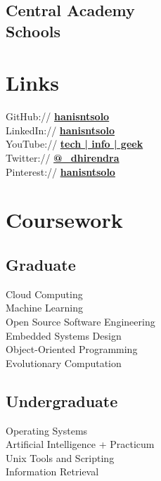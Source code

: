 \documentclass[]{dhirendra-pratap-singh-resume}
\begin{document}
\begin{minipage}[t]{0.33\textwidth}
\subsection{Central Academy \\ Schools}
\sectionsep


\section{Links} 
GitHub:// \href{https://github.com/hanisntsolo}{\bf hanisntsolo} \\
LinkedIn://  \href{https://www.linkedin.com/in/hanisntsolo/}{\bf hanisntsolo} \\
YouTube://  \href{https://www.youtube.com/channel/UCudY5NQeinXTD9I6eVn1WeQ}{\bf tech | info | geek} \\
Twitter://  \href{https://twitter.com/_dhirendra}{\bf @\_dhirendra} \\
Pinterest://  \href{https://in.pinterest.com/hanisntoslo/boards/}{\bf hanisntsolo}
\sectionsep


\section{Coursework}
\subsection{Graduate}
Cloud Computing \\
Machine Learning \\
Open Source Software Engineering \\
Embedded Systems Design \\
Object-Oriented Programming \\
Evolutionary Computation

\subsection{Undergraduate}
Operating Systems \\
Artificial Intelligence + Practicum \\
Unix Tools and Scripting \\
Information Retrieval
\sectionsep

%
%

\end{minipage}
\end{document}
